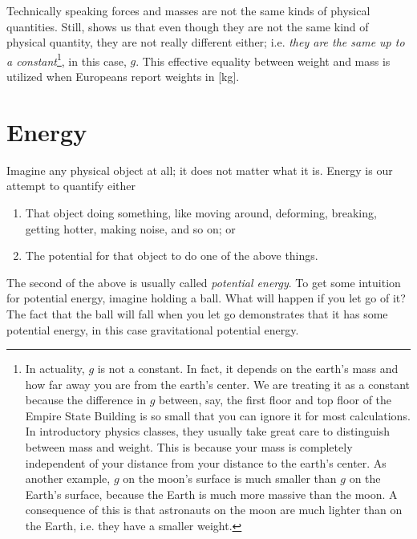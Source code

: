 Technically speaking forces and masses are not the same kinds of physical quantities.
Still,  shows us that even though they are not the same 
kind of physical quantity, they are not really different either; i.e. {\it they are the 
same up to a constant}\footnote{In actuality, $g$ is not a constant. In fact, it
depends on the earth’s mass and how far away you are from the earth’s center. We
are treating it as a constant because the difference in $g$ between, say, the
first floor and top floor of the Empire State Building is so small that you can
ignore it for most calculations. In introductory physics classes, they usually
take great care to distinguish between mass and weight. This is because your
mass is completely independent of your distance from your distance to the
earth’s center. As another example, $g$ on the moon’s surface is much smaller than
$g$ on the Earth’s surface, because the Earth is much more massive than the moon.
A consequence of this is that astronauts on the moon are much lighter than on
the Earth, i.e. they have a smaller weight.}, in this case, $g$. 
This effective equality between weight and mass is utilized when 
Europeans report weights in [kg].


\section{Energy}
Imagine any physical object at all; it does not matter what it is. 
Energy is our attempt to quantify either
\begin{enumerate}
    \item That object doing something, like moving around, deforming, breaking, 
          getting hotter, making noise, and so on; or
    \item The potential for that object to do one of the above things.
\end{enumerate}
The second of the above is usually called {\it potential
energy}. To get some intuition for potential energy, 
imagine holding a ball. What will happen if you let go of it? The fact that the 
ball will fall when you let go demonstrates that it has some potential energy, 
in this case gravitational potential energy.

